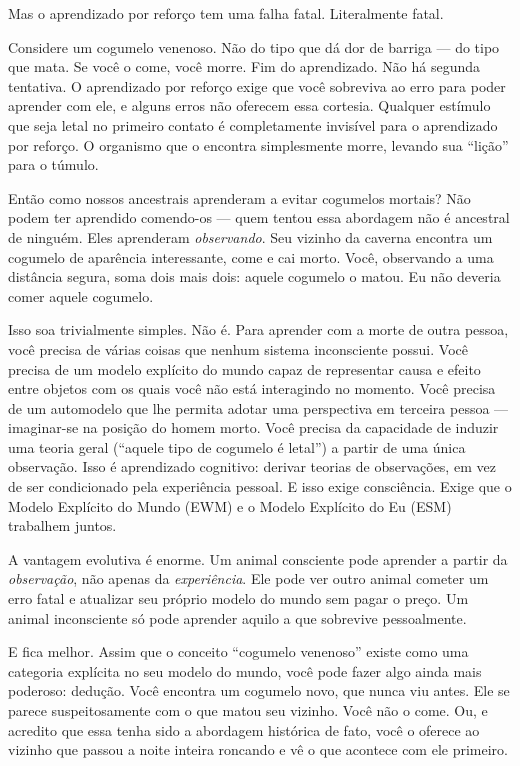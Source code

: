 \documentclass[11pt, twoside, openright]{book}
\begin{document}
Mas o aprendizado por reforço tem uma falha fatal. Literalmente fatal.

Considere um cogumelo venenoso. Não do tipo que dá dor de barriga --- do tipo que mata. Se você o come, você morre. Fim do aprendizado. Não há segunda tentativa. O aprendizado por reforço exige que você sobreviva ao erro para poder aprender com ele, e alguns erros não oferecem essa cortesia. Qualquer estímulo que seja letal no primeiro contato é completamente invisível para o aprendizado por reforço. O organismo que o encontra simplesmente morre, levando sua ``lição'' para o túmulo.

Então como nossos ancestrais aprenderam a evitar cogumelos mortais? Não podem ter aprendido comendo-os --- quem tentou essa abordagem não é ancestral de ninguém. Eles aprenderam \textit{observando}. Seu vizinho da caverna encontra um cogumelo de aparência interessante, come e cai morto. Você, observando a uma distância segura, soma dois mais dois: aquele cogumelo o matou. Eu não deveria comer aquele cogumelo.

Isso soa trivialmente simples. Não é. Para aprender com a morte de outra pessoa, você precisa de várias coisas que nenhum sistema inconsciente possui. Você precisa de um modelo explícito do mundo capaz de representar causa e efeito entre objetos com os quais você não está interagindo no momento. Você precisa de um automodelo que lhe permita adotar uma perspectiva em terceira pessoa --- imaginar-se na posição do homem morto. Você precisa da capacidade de induzir uma teoria geral (``aquele tipo de cogumelo é letal'') a partir de uma única observação. Isso é aprendizado cognitivo: derivar teorias de observações, em vez de ser condicionado pela experiência pessoal. E isso exige consciência. Exige que o Modelo Explícito do Mundo (EWM) e o Modelo Explícito do Eu (ESM) trabalhem juntos.

A vantagem evolutiva é enorme. Um animal consciente pode aprender a partir da \textit{observação}, não apenas da \textit{experiência}. Ele pode ver outro animal cometer um erro fatal e atualizar seu próprio modelo do mundo sem pagar o preço. Um animal inconsciente só pode aprender aquilo a que sobrevive pessoalmente.

E fica melhor. Assim que o conceito ``cogumelo venenoso'' existe como uma categoria explícita no seu modelo do mundo, você pode fazer algo ainda mais poderoso: dedução. Você encontra um cogumelo novo, que nunca viu antes. Ele se parece suspeitosamente com o que matou seu vizinho. Você não o come. Ou, e acredito que essa tenha sido a abordagem histórica de fato, você o oferece ao vizinho que passou a noite inteira roncando e vê o que acontece com ele primeiro.
\end{document}
